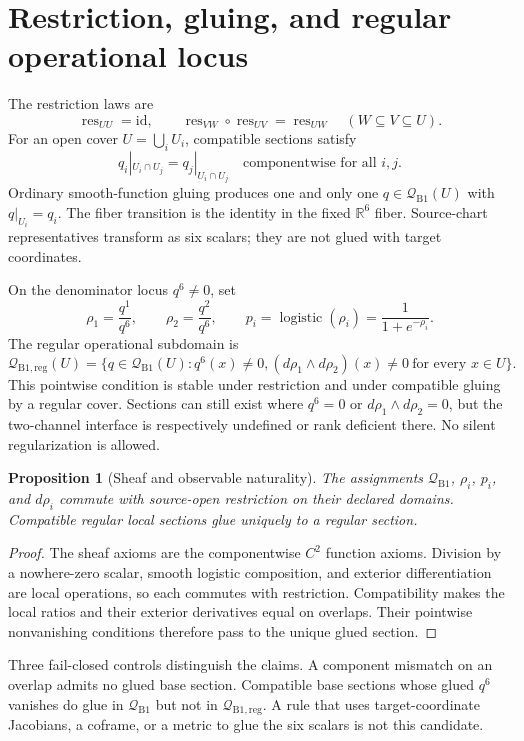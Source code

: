 \documentclass[11pt]{article}
\newtheorem{proposition}{Proposition}
\newcommand{\Q}{\mathcal Q_{\mathrm{B1}}}
\newcommand{\Qreg}{\mathcal Q_{\mathrm{B1,reg}}}
\newcommand{\sigm}{\operatorname{logistic}}
\begin{document}
\section{Restriction, gluing, and regular operational locus}

The restriction laws are
\[
 \operatorname{res}_{UU}=\mathrm{id},\qquad
 \operatorname{res}_{VW}\circ\operatorname{res}_{UV}
 =\operatorname{res}_{UW}\quad(W\subseteq V\subseteq U).
\]
For an open cover $U=\bigcup_i U_i$, compatible sections satisfy
\[
 q_i|_{U_i\cap U_j}=q_j|_{U_i\cap U_j}
 \quad\text{componentwise for all }i,j.
\]
Ordinary smooth-function gluing produces one and only one $q\in\Q(U)$ with
$q|_{U_i}=q_i$.  The fiber transition is the identity in the fixed
$\mathbb R^6$ fiber.  Source-chart representatives transform as six scalars;
they are not glued with target coordinates.

On the denominator locus $q^6\ne0$, set
\[
  \rho_1=\frac{q^1}{q^6},\qquad
  \rho_2=\frac{q^2}{q^6},\qquad
  p_i=\sigm(\rho_i)=\frac{1}{1+e^{-\rho_i}}.
\]
The regular operational subdomain is
\[
 \Qreg(U)=\{q\in\Q(U):q^6(x)\ne0,
   (d\rho_1\wedge d\rho_2)(x)\ne0\ \text{for every }x\in U\}.
\]
This pointwise condition is stable under restriction and under compatible
gluing by a regular cover.  Sections can still exist where $q^6=0$ or
$d\rho_1\wedge d\rho_2=0$, but the two-channel interface is respectively
undefined or rank deficient there.  No silent regularization is allowed.

\begin{proposition}[Sheaf and observable naturality]
The assignments $\Q$, $\rho_i$, $p_i$, and $d\rho_i$ commute with source-open
restriction on their declared domains.  Compatible regular local sections
glue uniquely to a regular section.
\end{proposition}
\begin{proof}
The sheaf axioms are the componentwise $C^2$ function axioms.  Division by a
nowhere-zero scalar, smooth logistic composition, and exterior differentiation
are local operations, so each commutes with restriction.  Compatibility makes
the local ratios and their exterior derivatives equal on overlaps.  Their
pointwise nonvanishing conditions therefore pass to the unique glued section.
\end{proof}

Three fail-closed controls distinguish the claims.  A component mismatch on
an overlap admits no glued base section.  Compatible base sections whose
glued $q^6$ vanishes do glue in $\Q$ but not in $\Qreg$.  A rule that
uses target-coordinate Jacobians, a coframe, or a metric to glue the six
scalars is not this candidate.
\end{document}
